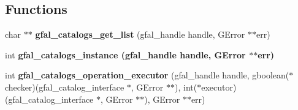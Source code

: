 \subsection*{Functions}
\begin{CompactItemize}
\item 
char $\ast$$\ast$ \textbf{gfal\_\-catalogs\_\-get\_\-list} (gfal\_\-handle handle, GError $\ast$$\ast$err)\label{gfal__common__catalog_8c_20c2d1d8a7a1ece12f74640325e0be89}

\item 
int \bf{gfal\_\-catalogs\_\-instance} (gfal\_\-handle handle, GError $\ast$$\ast$err)
\item 
int \textbf{gfal\_\-catalogs\_\-operation\_\-executor} (gfal\_\-handle handle, gboolean($\ast$checker)(gfal\_\-catalog\_\-interface $\ast$, GError $\ast$$\ast$), int($\ast$executor)(gfal\_\-catalog\_\-interface $\ast$, GError $\ast$$\ast$), GError $\ast$$\ast$err)\label{gfal__common__catalog_8c_50865ab5cba98b1c7e7f48d982120e3d}


\end{CompactItemize}
